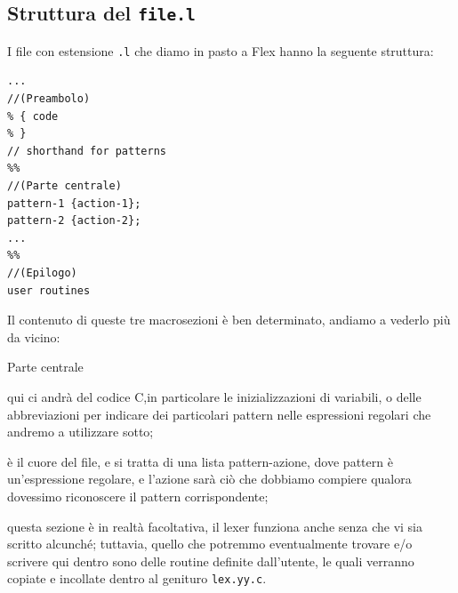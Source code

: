 \documentclass[class=book, crop=false, oneside, 12pt]{standalone}
\begin{document}
\subsection{Struttura del \texttt{file.l}}
I file con estensione \texttt{.l} che diamo in pasto a Flex hanno la seguente struttura:
\begin{verbatim}
...
//(Preambolo)
% { code
% }
// shorthand for patterns
%%
//(Parte centrale)
pattern-1 {action-1};
pattern-2 {action-2};
...
%%
//(Epilogo)
user routines
\end{verbatim}
Il contenuto di queste tre macrosezioni è ben determinato, andiamo a vederlo più da vicino:
\begin{labeling}{Parte centrale}
    \item[Preambolo] qui ci andrà del codice C,in particolare le inizializzazioni di variabili, o delle abbreviazioni per indicare dei particolari pattern nelle espressioni regolari che andremo a utilizzare sotto;
    \item[Parte centrale] è il cuore del file, e si tratta di una lista pattern-azione, dove pattern è un'espressione regolare, e l'azione sarà ciò che dobbiamo compiere qualora dovessimo riconoscere il pattern corrispondente;
    \item[Epilogo] questa sezione è in realtà facoltativa, il lexer funziona anche senza che vi sia scritto alcunché; tuttavia, quello che potremmo eventualmente trovare e/o scrivere qui dentro sono delle routine definite dall'utente, le quali verranno copiate e incollate dentro al genituro \texttt{lex.yy.c}.
\end{labeling}
\end{document}
